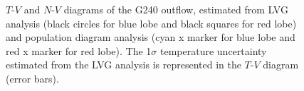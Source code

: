 \begin{figure}[htbp]
\centering
{}
\caption{$T$-$V$ and $N$-$V$ diagrams of the G240 outflow, estimated from LVG analysis (black circles for blue lobe and black squares for red lobe) and population diagram analysis (cyan x marker for blue lobe and red x marker for red lobe). The 1$\sigma$ temperature uncertainty estimated from the LVG analysis is represented in the $T$-$V$ diagram (error bars). \label{fig4}}
\end{figure}

